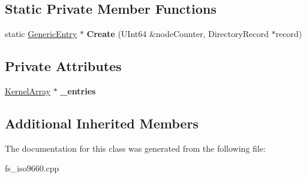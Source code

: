 \subsection*{Static Private Member Functions}
\begin{DoxyCompactItemize}
\item 
\mbox{\label{class_i_s_o9660_driver_1_1_directory_entry_a72fb6153bc7150d744e16447521996ad}} 
static \hyperlink{class_i_s_o9660_driver_1_1_generic_entry}{Generic\+Entry} $\ast$ {\bfseries Create} (U\+Int64 \&node\+Counter, Directory\+Record $\ast$record)
\end{DoxyCompactItemize}
\subsection*{Private Attributes}
\begin{DoxyCompactItemize}
\item 
\mbox{\label{class_i_s_o9660_driver_1_1_directory_entry_af72d3107d8492883fe27ae043fda5c2b}} 
\hyperlink{class_kernel_array}{Kernel\+Array} $\ast$ {\bfseries \+\_\+entries}
\end{DoxyCompactItemize}
\subsection*{Additional Inherited Members}


The documentation for this class was generated from the following file\+:\begin{DoxyCompactItemize}
\item 
fs\+\_\+iso9660.\+cpp\end{DoxyCompactItemize}
